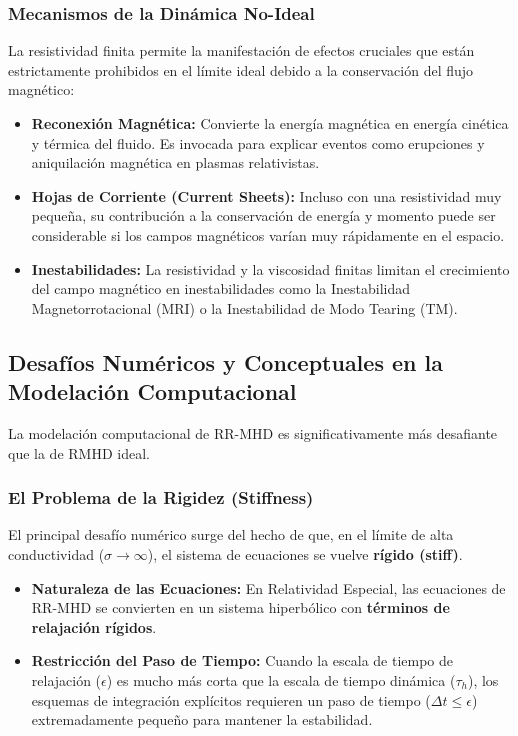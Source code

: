 \subsubsection{Mecanismos de la Dinámica No-Ideal}

La resistividad finita permite la manifestación de efectos cruciales que están estrictamente prohibidos en el límite ideal debido a la conservación del flujo magnético:

\begin{itemize}
    \item \textbf{Reconexión Magnética:} Convierte la energía magnética en energía cinética y térmica del fluido. Es invocada para explicar eventos como erupciones y aniquilación magnética en plasmas relativistas. 
    \item \textbf{Hojas de Corriente (Current Sheets):} Incluso con una resistividad muy pequeña, su contribución a la conservación de energía y momento puede ser considerable si los campos magnéticos varían muy rápidamente en el espacio.
    \item \textbf{Inestabilidades:} La resistividad y la viscosidad finitas limitan el crecimiento del campo magnético en inestabilidades como la Inestabilidad Magnetorrotacional (MRI) o la Inestabilidad de Modo Tearing (TM).
\end{itemize}

\subsection{Desafíos Numéricos y Conceptuales en la Modelación Computacional}

La modelación computacional de RR-MHD es significativamente más desafiante que la de RMHD ideal.

\subsubsection{El Problema de la Rigidez (Stiffness)}

El principal desafío numérico surge del hecho de que, en el límite de alta conductividad ($\sigma \to \infty$), el sistema de ecuaciones se vuelve \textbf{rígido (stiff)}.

\begin{itemize}
    \item \textbf{Naturaleza de las Ecuaciones:} En Relatividad Especial, las ecuaciones de RR-MHD se convierten en un sistema hiperbólico con \textbf{términos de relajación rígidos}.
    \item \textbf{Restricción del Paso de Tiempo:} Cuando la escala de tiempo de relajación ($\epsilon$) es mucho más corta que la escala de tiempo dinámica ($\tau_h$), los esquemas de integración explícitos requieren un paso de tiempo ($\Delta t \le \epsilon$) extremadamente pequeño para mantener la estabilidad.
\end{itemize}

